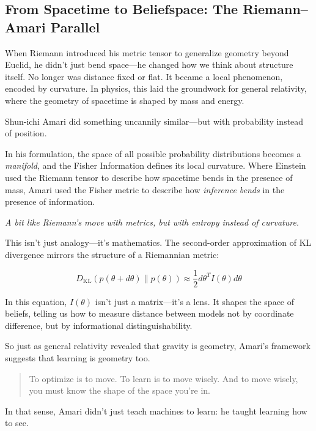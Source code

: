 \subsection{From Spacetime to Beliefspace: The Riemann–Amari Parallel}

When Riemann introduced his metric tensor to generalize geometry beyond Euclid, he didn’t just bend space—he changed how we think about structure itself. No longer was distance fixed or flat. It became a local phenomenon, encoded by curvature. In physics, this laid the groundwork for general relativity, where the geometry of spacetime is shaped by mass and energy.

Shun-ichi Amari did something uncannily similar—but with probability instead of position.

In his formulation, the space of all possible probability distributions becomes a \emph{manifold}, and the Fisher Information defines its local curvature. Where Einstein used the Riemann tensor to describe how spacetime bends in the presence of mass, Amari used the Fisher metric to describe how \emph{inference bends} in the presence of information.

\begin{center}
\textit{A bit like Riemann’s move with metrics, but with entropy instead of curvature.}
\end{center}

This isn’t just analogy—it’s mathematics. The second-order approximation of KL divergence mirrors the structure of a Riemannian metric:

\[
D_{\mathrm{KL}}(p(\theta + d\theta) \parallel p(\theta)) \approx \frac{1}{2} d\theta^T I(\theta) d\theta
\]

In this equation, \( I(\theta) \) isn’t just a matrix—it’s a lens. It shapes the space of beliefs, telling us how to measure distance between models not by coordinate difference, but by informational distinguishability.

So just as general relativity revealed that gravity is geometry, Amari’s framework suggests that learning is geometry too.

\begin{quote}
To optimize is to move.  
To learn is to move wisely.  
And to move wisely, you must know the shape of the space you're in.
\end{quote}

In that sense, Amari didn’t just teach machines to learn: he taught learning how to see.
